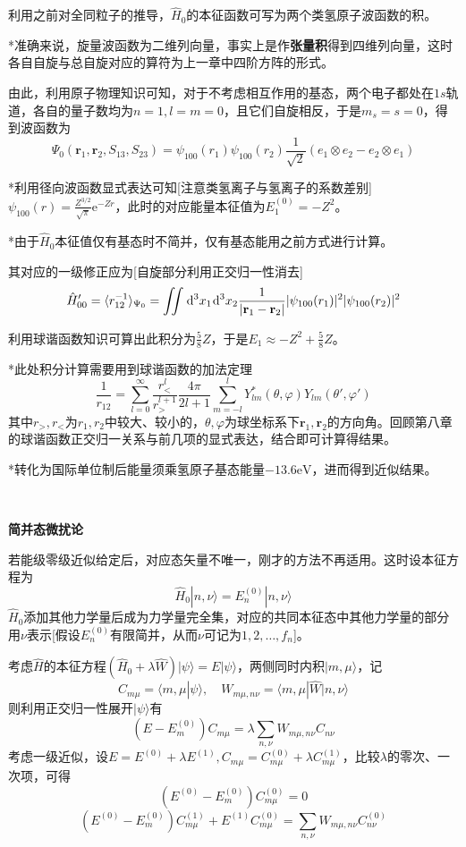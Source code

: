 \documentclass[a4paper,UTF8,fontset=windows]{ctexart}
\newcommand*{\dr}{\hspace{0.07em}\mathrm{d}}
\newcommand*{\er}{\mathrm{e}}
\newcommand*{\ket}[1]{|#1\rangle}
\newcommand*{\bk}[2]{\langle#1|#2\rangle}
\newcommand*{\blk}[3]{\langle#1|#2|#3\rangle}
\newcommand*{\br}{\mathbf{r}}
\begin{document}
\begin{enumerate}
    利用之前对全同粒子的推导，$\hat{H}_0$的本征函数可写为两个类氢原子波函数的积。
    
    *准确来说，旋量波函数为二维列向量，事实上是作\textbf{张量积}得到四维列向量，这时各自自旋与总自旋对应的算符为上一章中四阶方阵的形式。

    由此，利用原子物理知识可知，对于不考虑相互作用的基态，两个电子都处在$1s$轨道，各自的量子数均为$n=1,l=m=0$，且它们自旋相反，于是$m_s=s=0$，得到波函数为
    $$\Psi_0(\br_1,\br_2,S_{13},S_{23})=\psi_{100}(r_1)\psi_{100}(r_2)\frac{1}{\sqrt2}(e_1\otimes e_2-e_2\otimes e_1)$$

    *利用径向波函数显式表达可知[注意类氢离子与氢离子的系数差别]\ $\psi_{100}(r)=\frac{Z^{3/2}}{\sqrt\pi}\er^{-Zr}$，此时的对应能量本征值为$E_1^{(0)}=-Z^2$。

    *由于$\hat{H}_0$本征值仅有基态时不简并，仅有基态能用之前方式进行计算。

    其对应的一级修正应为[自旋部分利用正交归一性消去]
    $$\hat{H}'_{00}=\langle r_{12}^{-1}\rangle_{\Psi_0}=\iint\dr^3x_1\dr^3x_2\frac{1}{|\br_1-\br_2|}|\psi_{100}(r_1)|^2|\psi_{100}(r_2)|^2$$

    利用球谐函数知识可算出此积分为$\frac{5}{8}Z$，于是$E_1\approx-Z^2+\frac{5}{8}Z$。

    *此处积分计算需要用到球谐函数的加法定理
    $$\frac{1}{r_{12}}=\sum_{l=0}^\infty\frac{r_<^l}{r_>^{l+1}}\frac{4\pi}{2l+1}\sum_{m=-l}^lY_{lm}^*(\theta,\varphi)Y_{lm}(\theta',\varphi')$$
    其中$r_>,r_<$为$r_1,r_2$中较大、较小的，$\theta,\varphi$为球坐标系下$\br_1,\br_2$的方向角。回顾第八章的球谐函数正交归一关系与前几项的显式表达，结合即可计算得结果。

    *转化为国际单位制后能量须乘氢原子基态能量$-13.6\text{eV}$，进而得到近似结果。
\end{enumerate}

\

\textbf{简并态微扰论}

若能级零级近似给定后，对应态矢量不唯一，刚才的方法不再适用。这时设本征方程为
$$\hat{H}_0\ket{n,\nu}=E_n^{(0)}\ket{n,\nu}$$
$\hat{H}_0$添加其他力学量后成为力学量完全集，对应的共同本征态中其他力学量的部分用$\nu$表示[假设$E_n^{(0)}$有限简并，从而$\nu$可记为$1,2,\dots,f_n$]。

考虑$\hat{H}$的本征方程$(\hat{H}_0+\lambda\hat{W})\ket{\psi}=E\ket{\psi}$，两侧同时内积$\ket{m,\mu}$，记
$$C_{m\mu}=\bk{m,\mu}{\psi},\quad W_{m\mu,n\nu}=\blk{m,\mu}{\hat{W}}{n,\nu}$$
则利用正交归一性展开$\ket{\psi}$有
$$(E-E_m^{(0)})C_{m\mu}=\lambda\sum_{n,\nu}W_{m\mu,n\nu}C_{n\nu}$$
考虑一级近似，设$E=E^{(0)}+\lambda E^{(1)},C_{m\mu}=C_{m\mu}^{(0)}+\lambda C_{m\mu}^{(1)}$，比较$\lambda$的零次、一次项，可得
$$(E^{(0)}-E_m^{(0)})C_{m\mu}^{(0)}=0$$
$$(E^{(0)}-E_m^{(0)})C_{m\mu}^{(1)}+E^{(1)}C_{m\mu}^{(0)}=\sum_{n,\nu}W_{m\mu,n\nu}C_{n\nu}^{(0)}$$
\end{document}
